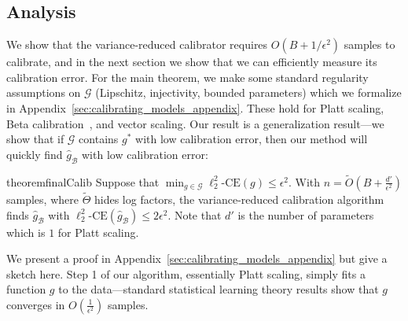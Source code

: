 

\subsection{Analysis}

We  show that the variance-reduced calibrator requires $O(B + 1/\epsilon^2)$ samples to calibrate, and in the next section  we show that we can efficiently measure its calibration error. For the main theorem, we make some standard regularity assumptions on $\mathcal{G}$ (Lipschitz, injectivity, bounded parameters) which we formalize in Appendix~\ref{sec:calibrating_models_appendix}. These hold for Platt scaling, Beta calibration~\cite{kull2017sigmoids}, and vector scaling. Our result is a generalization result---we show that if $\mathcal{G}$ contains  $g^*$ with low calibration error, then our method will quickly find $\hat{g}_{\mathcal{B}}$ with low calibration error:

\begin{restatable}{theorem}{finalCalib}
\label{thm:final-calib}
Suppose that $\min_{g \in \mathcal{G}}\ell_2^2\mbox{-CE}(g) \leq \epsilon^2$.
  With $n = \widetilde{O}(B + \frac{d'}{\epsilon^2})$ samples, where $\widetilde{\Theta}$ hides log factors, the variance-reduced calibration algorithm  finds $\hat{g}_{\mathcal{B}}$ with $\ell_2^2\mbox{-CE}(\hat{g}_{\mathcal{B}}) \leq 2 \epsilon^2$. Note that $d'$ is the number of parameters which is $1$ for Platt scaling.
\end{restatable}

We present a proof in Appendix~\ref{sec:calibrating_models_appendix} but give a sketch here. Step 1 of our algorithm, essentially  Platt scaling, simply fits a function $g$ to the data---standard statistical learning theory results show that $g$ converges in $O(\frac{1}{\epsilon^2})$ samples.

